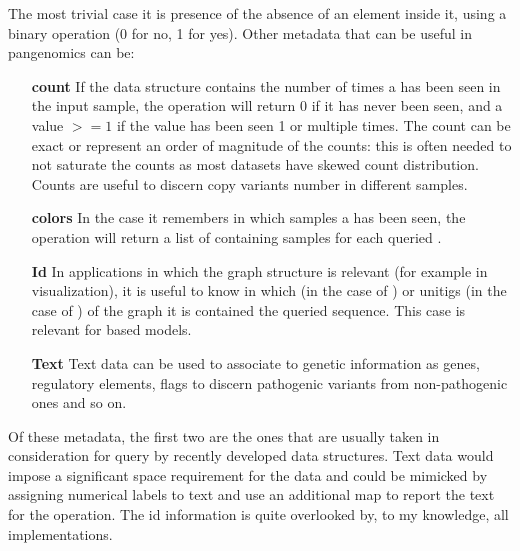 The most trivial case it is presence of the absence of an element inside it, using a binary \memb operation (0 for no, 1 for yes).  Other metadata that can be useful in pangenomics can be:
\begin{itemize}
	\item[\textbf{count}] If the data structure contains the number of times a \kmer has been seen in the input sample, the \memb operation will return 0 if it has never been seen, and a value $>= 1$ if the value has been seen 1 or multiple times. The count can be exact or represent an order of magnitude of the counts: this is often needed to not saturate the counts as most datasets have skewed \kmer count distribution. Counts are useful to discern copy variants number in different samples.
	\item[\textbf{colors}] In the case it remembers in which samples a \kmer has been seen, the \memb operation will return a list of containing samples for each queried \kmer. 
	\item[\textbf{Id}] In applications in which the graph structure is relevant (for example in visualization), it is useful to know in which \kmers (in the case of \dbg) or unitigs (in the case of \cdbg) of the graph it is contained the queried sequence. This case is relevant for \dbg based models.
	\item[\textbf{Text}] Text data can be used to associate \kmers to genetic information as genes, regulatory elements, flags to discern pathogenic variants from non-pathogenic ones and so on.
\end{itemize}
Of these metadata, the first two are the ones that are usually taken in consideration for query by recently developed data structures. Text data would impose a significant space requirement for the data and could be mimicked by assigning numerical labels to text and use an additional map to report the text for the \memb operation. The id information is quite overlooked by, to my knowledge, all implementations.

